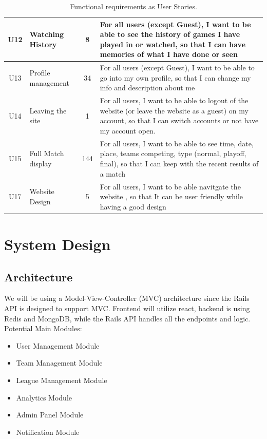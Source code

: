 \documentclass{article}
\begin{document}
\begin{table}[h!]
\begin{tabular}{c l c p{10cm}}
\\ \hline
U12 & Watching History & 8 & For all users (except Guest), I want to be able to see the history of games I have played in or watched, so that I can have memories of what I have done or seen
\\ \hline
U13 & Profile management & 34 & For all users (except Guest), I want to be able to go into my own profile, so that I can change my info and description about me
\\ \hline
U14 & Leaving the site & 1 & For all users, I want to be able to logout of the website (or leave the website as a guest) on my account, so that I can switch accounts or not have my account open. 
\\ \hline
U15 & Full Match display & 144 & For all users, I want to be able to see time, date, place, teams competing, type (normal, playoff, final), so that I can keep with the recent results of a match
\\ \hline
U17 & Website Design & 5 & For all users, I want to be able navitgate the website , so that It can be user friendly while having a good design
\\ \hline


\end{tabular}
\caption{Functional requirements as User Stories.}
\end{table}

\section{System Design}

\subsection{Architecture}
We will be using a Model-View-Controller (MVC) architecture since the Rails API is designed to support MVC. Frontend will utilize react, backend is using Redis and MongoDB, while the Rails API handles all the endpoints and logic.\\
Potential Main Modules:
\begin{itemize}
    \item User Management Module
    \item Team Management Module
    \item League Management Module
    \item Analytics Module
    \item Admin Panel Module
    \item Notification Module
\end{itemize}
\end{document}
